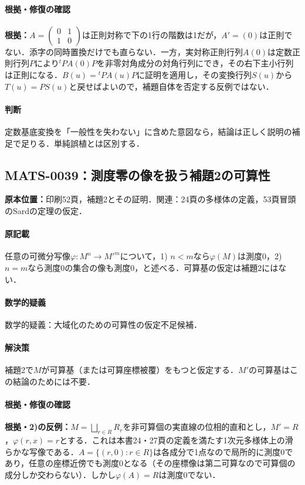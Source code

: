 \documentclass[a4paper,10pt]{ltjsarticle}
\begin{document}
\paragraph{根拠・修復の確認}\textbf{根拠：}$A=\left(\begin{smallmatrix}0&1\\1&0\end{smallmatrix}\right)$は正則対称で下の1行の階数は1だが，$A'=(0)$は正則でない．添字の同時置換だけでも直らない．一方，実対称正則行列$A(0)$は定数正則行列$P$により${}^tP A(0)P$を非零対角成分の対角行列にでき，その右下主小行列は正則になる．$B(u)={}^tP A(u)P$に証明を適用し，その変換行列$S(u)$から$T(u)=P S(u)$と戻せばよいので，補題自体を否定する反例ではない．

\paragraph{判断}定数基底変換を「一般性を失わない」に含めた意図なら，結論は正しく説明の補足で足りる．単純誤植とは区別する．


\subsection*{MATS-0039：測度零の像を扱う補題2の可算性}\label{math:MATS-0039}
\noindent\textbf{原本位置：}印刷52頁，補題2とその証明．関連：24頁の多様体の定義，53頁冒頭のSardの定理の仮定．

\paragraph{原記載}任意の可微分写像$\varphi:M^n\to M'^m$について，1) $n<m$なら$\varphi(M)$は測度0，2) $n=m$なら測度0の集合の像も測度0，と述べる．可算基の仮定は補題2にはない．

\paragraph{数学的疑義}数学的疑義：大域化のための可算性の仮定不足候補．

\paragraph{解決策}補題2で$M$が可算基（または可算座標被覆）をもつと仮定する．$M'$の可算基はこの結論のためには不要．

\paragraph{根拠・修復の確認}\textbf{根拠・2)の反例：}$M=\bigsqcup_{r\in R}R_r$を非可算個の実直線の位相的直和とし，$M'=R$，$\varphi(r,x)=r$とする．これは本書24・27頁の定義を満たす1次元多様体上の滑らかな写像である．$A=\{(r,0):r\in R\}$は各成分で1点なので局所的に測度0であり，任意の座標近傍でも測度0となる（その座標像は第二可算なので可算個の成分しか交わらない）．しかし$\varphi(A)=R$は測度0でない．
\end{document}
